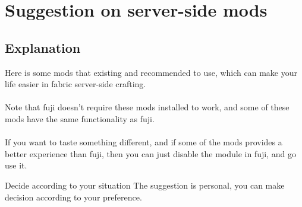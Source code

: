 \section{Suggestion on server-side mods}

\subsection{Explanation}
Here is some mods that existing and recommended to use, which can make your life easier in fabric server-side crafting.
\\\\
Note that fuji doesn't require these mods installed to work, and some of these mods have the same functionality as fuji.
\\\\
If you want to taste something different, and if some of the mods provides a better experience than fuji, then you can just disable the module in fuji, and go use it.

\begin{tips}{Decide according to your situation}
    The suggestion is personal, you can make decision according to your preference.
\end{tips}

\clearpage
